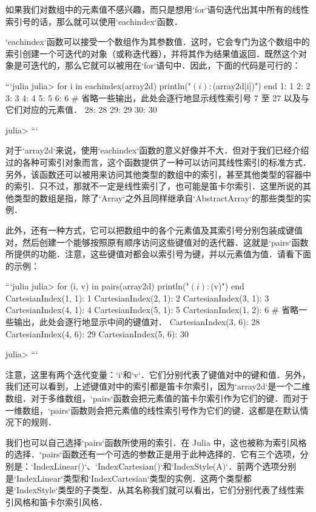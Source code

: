 如果我们对数组中的元素值不感兴趣，而只是想用`for`语句迭代出其中所有的线性索引号的话，那么就可以使用`eachindex`函数．

`eachindex`函数可以接受一个数组作为其参数值．这时，它会专门为这个数组中的索引创建一个可迭代的对象（或称迭代器），并将其作为结果值返回．既然这个对象是可迭代的，那么它就可以被用在`for`语句中．因此，下面的代码是可行的：

```julia
julia> for i in eachindex(array2d)
           println("$(i): $(array2d[i])")
       end
1: 1
2: 2
3: 3
4: 4
5: 5
6: 6
# 省略一些输出，此处会逐行地显示线性索引号 7 至 27 以及与它们对应的元素值．
28: 28
29: 29
30: 30

julia> 
```

对于`array2d`来说，使用`eachindex`函数的意义好像并不大．但对于我们已经介绍过的各种可索引对象而言，这个函数提供了一种可以访问其线性索引的标准方式．另外，该函数还可以被用来访问其他类型的数组中的索引，甚至其他类型的容器中的索引．只不过，那就不一定是线性索引了，也可能是笛卡尔索引．这里所说的其他类型的数组是指，除了`Array`之外且同样继承自`AbstractArray`的那些类型的实例．

此外，还有一种方式，它可以把数组中的各个元素值及其索引号分别包装成键值对，然后创建一个能够按照原有顺序访问这些键值对的迭代器．这就是`pairs`函数所提供的功能．注意，这些键值对都会以索引号为键，并以元素值为值．请看下面的示例：

```julia
julia> for (i, v) in pairs(array2d)
           println("$(i): $(v)")
       end
CartesianIndex(1, 1): 1
CartesianIndex(2, 1): 2
CartesianIndex(3, 1): 3
CartesianIndex(4, 1): 4
CartesianIndex(5, 1): 5
CartesianIndex(1, 2): 6
# 省略一些输出，此处会逐行地显示中间的键值对．
CartesianIndex(3, 6): 28
CartesianIndex(4, 6): 29
CartesianIndex(5, 6): 30

julia> 
```

注意，这里有两个迭代变量：`i`和`v`．它们分别代表了键值对中的键和值．另外，我们还可以看到，上述键值对中的索引都是笛卡尔索引，因为`array2d`是一个二维数组．对于多维数组，`pairs`函数会把元素值的笛卡尔索引作为它们的键．而对于一维数组，`pairs`函数则会把元素值的线性索引号作为它们的键．这都是在默认情况下的规则．

我们也可以自己选择`pairs`函数所使用的索引．在 Julia 中，这也被称为索引风格的选择．`pairs`函数还有一个可选的参数正是用于此种选择的．它有三个选项，分别是：`IndexLinear()`、`IndexCartesian()`和`IndexStyle(A)`．前两个选项分别是`IndexLinear`类型和`IndexCartesian`类型的实例．这两个类型都是`IndexStyle`类型的子类型．从其名称我们就可以看出，它们分别代表了线性索引风格和笛卡尔索引风格．

